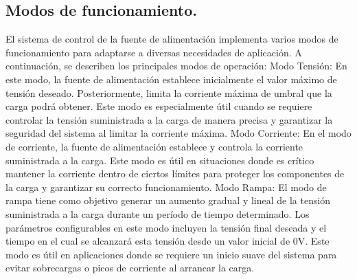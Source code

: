 \subsection{Modos de funcionamiento.}
El sistema de control de la fuente de alimentación implementa varios modos de funcionamiento para adaptarse a diversas necesidades de aplicación. A continuación, se describen los principales modos de operación:
Modo Tensión:
En este modo, la fuente de alimentación establece inicialmente el valor máximo de tensión deseado. Posteriormente, limita la corriente máxima de umbral que la carga podrá obtener. Este modo es especialmente útil cuando se requiere controlar la tensión suministrada a la carga de manera precisa y garantizar la seguridad del sistema al limitar la corriente máxima.
Modo Corriente:
En el modo de corriente, la fuente de alimentación establece y controla la corriente suministrada a la carga. Este modo es útil en situaciones donde es crítico mantener la corriente dentro de ciertos límites para proteger los componentes de la carga y garantizar su correcto funcionamiento.
Modo Rampa:
El modo de rampa tiene como objetivo generar un aumento gradual y lineal de la tensión suministrada a la carga durante un período de tiempo determinado. Los parámetros configurables en este modo incluyen la tensión final deseada y el tiempo en el cual se alcanzará esta tensión desde un valor inicial de 0V. Este modo es útil en aplicaciones donde se requiere un inicio suave del sistema para evitar sobrecargas o picos de corriente al arrancar la carga.

